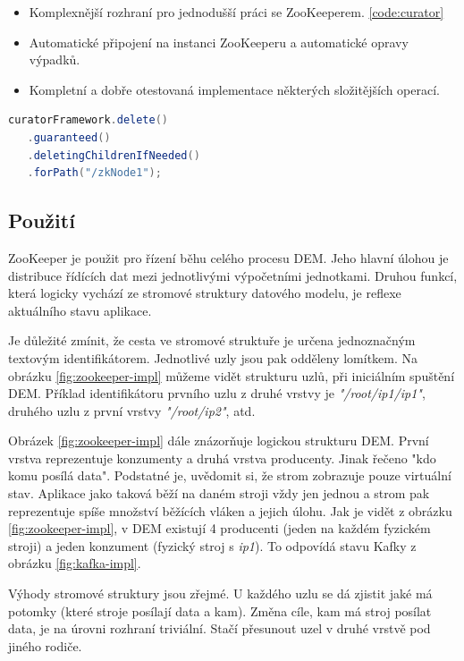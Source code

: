\documentclass[
  digital, %
  table,   %
  nolof,     %
  nolot,     %
  oneside, %
  nocover,
  monochrome,
  12pt
]{fithesis3}
\begin{document}
\begin{itemize}
  \item Komplexnější rozhraní pro jednodušší práci se ZooKeeperem. \ref{code:curator}
  \item Automatické připojení na instanci ZooKeeperu a automatické opravy výpadků.
  \item Kompletní a dobře otestovaná implementace některých složitějších operací.
\end{itemize}

\begin{lstlisting}[label=code:curator,caption={Demonstrace jednoduchého použití aplikačního rámce Curator, na smazání uzlu \textit{zkNode1} a všech jeho potomků.},language=Java]
curatorFramework.delete()
   .guaranteed()
   .deletingChildrenIfNeeded()
   .forPath("/zkNode1");
\end{lstlisting}

 
\subsection*{Použití}
ZooKeeper je použit pro řízení běhu celého procesu DEM. Jeho hlavní úlohou je distribuce řídících dat mezi jednotlivými výpočetními jednotkami. Druhou funkcí, která logicky vychází ze stromové struktury datového modelu, je reflexe aktuálního stavu aplikace.

Je důležité zmínit, že cesta ve stromové struktuře je určena jednoznačným textovým identifikátorem. Jednotlivé uzly jsou pak odděleny lomítkem. Na obrázku \ref{fig:zookeeper-impl} můžeme vidět strukturu uzlů, při iniciálním spuštění DEM. Příklad identifikátoru prvního uzlu z druhé vrstvy je \textit{"/root/ip1/ip1"}, druhého uzlu z první vrstvy \textit{"/root/ip2"}, atd.

Obrázek \ref{fig:zookeeper-impl} dále znázorňuje logickou strukturu DEM. První vrstva reprezentuje konzumenty a druhá vrstva producenty. Jinak řečeno "kdo komu posílá data". Podstatné je, uvědomit si, že strom zobrazuje pouze virtuální stav. Aplikace jako taková běží na daném stroji vždy jen jednou a strom pak reprezentuje spíše množství běžících vláken a jejich úlohu. Jak je vidět z obrázku \ref{fig:zookeeper-impl}, v DEM existují 4 producenti (jeden na každém fyzickém stroji) a jeden konzument (fyzický stroj s \textit{ip1}). To odpovídá stavu Kafky z obrázku \ref{fig:kafka-impl}.

Výhody stromové struktury jsou zřejmé. U každého uzlu se dá zjistit jaké má potomky (které stroje posílají data a kam). Změna cíle, kam má stroj posílat data, je na úrovni rozhraní triviální. Stačí přesunout uzel v druhé vrstvě pod jiného rodiče.
\end{document}
